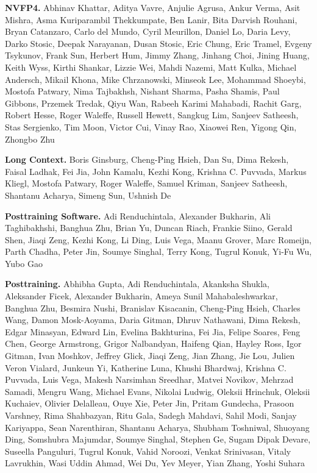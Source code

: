 \textbf{NVFP4.} Abhinav Khattar, Aditya Vavre, Anjulie Agrusa, Ankur Verma, Asit Mishra, Asma Kuriparambil Thekkumpate, Ben Lanir, Bita Darvish Rouhani, Bryan Catanzaro, Carlo del Mundo, Cyril Meurillon, Daniel Lo, Daria Levy, Darko Stosic, Deepak Narayanan, Dusan Stosic, Eric Chung, Eric Tramel, Evgeny Tsykunov, Frank Sun, Herbert Hum, Jimmy Zhang, Jinhang Choi, Jining Huang, Keith Wyss, Kirthi Shankar, Lizzie Wei, Mahdi Nazemi, Matt Kulka, Michael Andersch, Mikail Khona, Mike Chrzanowski, Minseok Lee, Mohammad Shoeybi, Mostofa Patwary, Nima Tajbakhsh, Nishant Sharma, Pasha Shamis, Paul Gibbons, Przemek Tredak, Qiyu Wan, Rabeeh Karimi Mahabadi, Rachit Garg, Robert Hesse, Roger Waleffe, Russell Hewett, Sangkug Lim, Sanjeev Satheesh, Stas Sergienko, Tim Moon, Victor Cui, Vinay Rao, Xiaowei Ren, Yigong Qin, Zhongbo Zhu

\textbf{Long Context.} Boris Ginsburg, Cheng-Ping Hsieh, Dan Su, Dima Rekesh, Faisal Ladhak, Fei Jia, John Kamalu, Kezhi Kong, Krishna C. Puvvada, Markus Kliegl, Mostofa Patwary, Roger Waleffe, Samuel Kriman, Sanjeev Satheesh, Shantanu Acharya, Simeng Sun, Ushnish De

\textbf{Posttraining Software.} Adi Renduchintala, Alexander Bukharin, Ali Taghibakhshi, Banghua Zhu, Brian Yu, Duncan Riach, Frankie Siino, Gerald Shen, Jiaqi Zeng, Kezhi Kong, Li Ding, Luis Vega, Maanu Grover, Marc Romeijn, Parth Chadha, Peter Jin, Soumye Singhal, Terry Kong, Tugrul Konuk, Yi-Fu Wu, Yubo Gao

\textbf{Posttraining.} Abhibha Gupta, Adi Renduchintala, Akanksha Shukla, Aleksander Ficek, Alexander Bukharin, Ameya Sunil Mahabaleshwarkar, Banghua Zhu, Besmira Nushi, Branislav Kisacanin, Cheng-Ping Hsieh, Charles Wang, Damon Mosk-Aoyama, Daria Gitman, Dhruv Nathawani, Dima Rekesh, Edgar Minasyan, Edward Lin, Evelina Bakhturina, Fei Jia, Felipe Soares, Feng Chen, George Armstrong, Grigor Nalbandyan, Haifeng Qian, Hayley Ross, Igor Gitman, Ivan Moshkov, Jeffrey Glick, Jiaqi Zeng, Jian Zhang, Jie Lou, Julien Veron Vialard, Junkeun Yi, Katherine Luna, Khushi Bhardwaj, Krishna C. Puvvada, Luis Vega, Makesh Narsimhan Sreedhar, Matvei Novikov, Mehrzad Samadi, Mengru Wang, Michael Evans, Nikolai Ludwig, Oleksii Hrinchuk, Oleksii Kuchaiev, Olivier Delalleau, Ouye Xie, Peter Jin, Pritam Gundecha, Prasoon Varshney, Rima Shahbazyan, Ritu Gala, Sadegh Mahdavi, Sahil Modi, Sanjay Kariyappa, Sean Narenthiran, Shantanu Acharya, Shubham Toshniwal, Shuoyang Ding, Somshubra Majumdar, Soumye Singhal, Stephen Ge, Sugam Dipak Devare, Suseella Panguluri, Tugrul Konuk, Vahid Noroozi, Venkat Srinivasan, Vitaly Lavrukhin, Wasi Uddin Ahmad, Wei Du, Yev Meyer, Yian Zhang, Yoshi Suhara

